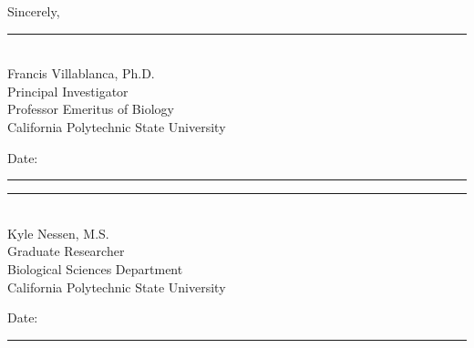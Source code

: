 \begin{samepage}
\begin{singlespace}

\noindent Sincerely,

\vspace{3em}

\noindent\rule{0.45\textwidth}{0.4pt}\\[0.5em]
Francis Villablanca, Ph.D.\\
Principal Investigator\\
Professor Emeritus of Biology\\
California Polytechnic State University

\vspace{0.5em}

\noindent Date: \rule{0.3\textwidth}{0.4pt}

\vspace{3em}

\noindent\rule{0.45\textwidth}{0.4pt}\\[0.5em]
Kyle Nessen, M.S.\\
Graduate Researcher\\
Biological Sciences Department\\
California Polytechnic State University

\vspace{0.5em}

\noindent Date: \rule{0.3\textwidth}{0.4pt}

\end{singlespace}
\end{samepage}
